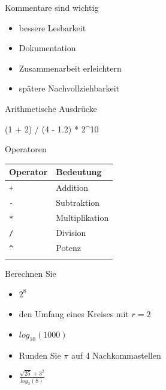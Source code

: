 \documentclass[
  10pt,
  ignorenonframetext,
  aspectratio=169,
]{beamer}
\newenvironment{Shaded}{}{}
\newcommand{\DecValTok}[1]{\textcolor[rgb]{0.25,0.63,0.44}{#1}}
\newcommand{\FloatTok}[1]{\textcolor[rgb]{0.25,0.63,0.44}{#1}}
\newcommand{\NormalTok}[1]{#1}
\newcommand{\SpecialCharTok}[1]{\textcolor[rgb]{0.25,0.44,0.63}{#1}}
\providecommand{\tightlist}{%
  \setlength{\itemsep}{0pt}\setlength{\parskip}{0pt}}
\begin{document}
\begin{frame}{Kommentare sind wichtig}
\label{kommentare-sind-wichtig}
\begin{itemize}
\tightlist
\item
  bessere Lesbarkeit
\item
  Dokumentation
\item
  Zusammenarbeit erleichtern
\item
  spätere Nachvollziehbarkeit
\end{itemize}
\end{frame}

\begin{frame}[fragile]{Arithmetische Ausdrücke}
\label{arithmetische-ausdruxfccke}
\begin{Shaded}
\begin{Highlighting}[]
\NormalTok{(}\DecValTok{1} \SpecialCharTok{+} \DecValTok{2}\NormalTok{) }\SpecialCharTok{/}\NormalTok{ (}\DecValTok{4} \SpecialCharTok{{-}} \FloatTok{1.2}\NormalTok{) }\SpecialCharTok{*} \DecValTok{2}\SpecialCharTok{\^{}}\DecValTok{10}
\end{Highlighting}
\end{Shaded}
\end{frame}

\begin{frame}[fragile]{Operatoren}
\label{operatoren}
\begin{longtable}[]{@{}ll@{}}
\toprule\noalign{}
Operator & Bedeutung \\
\midrule\noalign{}
\endhead
\texttt{+} & Addition \\
\texttt{-} & Subtraktion \\
\texttt{*} & Multiplikation \\
\texttt{/} & Division \\
\texttt{\^{}} & Potenz \\
\bottomrule\noalign{}
\end{longtable}
\end{frame}

\begin{frame}{Berechnen Sie}
\label{berechnen-sie}
\begin{itemize}
\tightlist
\item
  \(2^8\)
\item
  den Umfang eines Kreises mit \(r=2\)
\item
  \(log_{10}(1000)\)
\item
  Runden Sie \(\pi\) auf 4 Nachkommastellen
\item
  \(\frac{\sqrt{25} + 3^2}{log_2(8)}\)
\end{itemize}
\end{frame}
\end{document}
